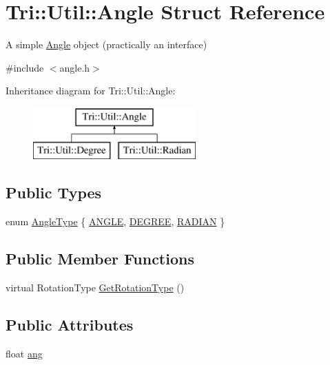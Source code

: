 \hypertarget{struct_tri_1_1_util_1_1_angle}{}\section{Tri\+:\+:Util\+:\+:Angle Struct Reference}
\label{struct_tri_1_1_util_1_1_angle}


A simple \hyperlink{struct_tri_1_1_util_1_1_angle}{Angle} object (practically an interface)  




{\ttfamily \#include $<$angle.\+h$>$}

Inheritance diagram for Tri\+:\+:Util\+:\+:Angle\+:\begin{figure}[H]
\begin{center}
\leavevmode
\includegraphics[height=2.000000cm]{struct_tri_1_1_util_1_1_angle}
\end{center}
\end{figure}
\subsection*{Public Types}
\begin{DoxyCompactItemize}
\item 
enum \hyperlink{group__lus__angle_gaca94575079e216b1da1ea5554afc2ead}{Angle\+Type} \{ \hyperlink{group__lus__angle_ggaca94575079e216b1da1ea5554afc2eadabbf80ee4ecfeb9cae8b5865be90e6a61}{A\+N\+G\+L\+E}, 
\hyperlink{group__lus__angle_ggaca94575079e216b1da1ea5554afc2eadad003001e24559da5a6e2032f20158074}{D\+E\+G\+R\+E\+E}, 
\hyperlink{group__lus__angle_ggaca94575079e216b1da1ea5554afc2eadae21b4856d1d3786bba52e752a26c2a7f}{R\+A\+D\+I\+A\+N}
 \}
\end{DoxyCompactItemize}
\subsection*{Public Member Functions}
\begin{DoxyCompactItemize}
\item 
virtual Rotation\+Type \hyperlink{struct_tri_1_1_util_1_1_angle_a2c39eaf2a838636836ea578328777ad1}{Get\+Rotation\+Type} ()
\end{DoxyCompactItemize}
\subsection*{Public Attributes}
\begin{DoxyCompactItemize}
\item 
float \hyperlink{struct_tri_1_1_util_1_1_angle_a38c78e367d283762e443cc630c021a0d}{ang}
\end{DoxyCompactItemize}


